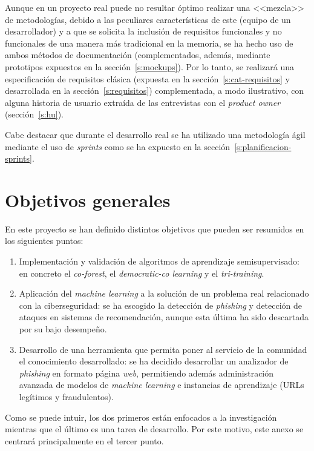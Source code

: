Aunque en un proyecto real puede no resultar óptimo realizar una <<mezcla>> de metodologías, debido a las peculiares características de este (equipo de un desarrollador) y a que se solicita la inclusión de requisitos funcionales y no funcionales de una manera más tradicional en la memoria, se ha hecho uso de ambos métodos de documentación (complementados, además, mediante prototipos expuestos en la sección~\ref{s:mockups}). Por lo tanto, se realizará una especificación de requisitos clásica (expuesta en la sección~\ref{s:cat-requisitos} y desarrollada en la sección~\ref{s:requisitos}) complementada, a modo ilustrativo, con alguna historia de usuario extraída de las entrevistas con el \textit{product owner} (sección~\ref{s:hu}). 

Cabe destacar que durante el desarrollo real se ha utilizado una metodología ágil mediante el uso de \textit{sprints} como se ha expuesto en la sección~\ref{s:planificacion-sprints}.

\section{Objetivos generales}

En este proyecto se han definido distintos objetivos que pueden ser resumidos en los siguientes puntos:
\begin{enumerate}
	\item Implementación y validación de algoritmos de aprendizaje semisupervisado: en concreto el \textit{co-forest}, el \textit{democratic-co learning} y el \textit{tri-training}.
	\item Aplicación del \textit{machine learning} a la solución de un problema real relacionado con la ciberseguridad: se ha escogido la detección de \textit{phishing} y detección de ataques en sistemas de recomendación, aunque esta última ha sido descartada por su bajo desempeño.
	\item Desarrollo de una herramienta que permita poner al servicio de la comunidad el conocimiento desarrollado: se ha decidido desarrollar un analizador de \textit{phishing} en formato página \textit{web}, permitiendo además administración avanzada de modelos de \textit{machine learning} e instancias de aprendizaje (URLs legítimos y fraudulentos).
\end{enumerate}

Como se puede intuir, los dos primeros están enfocados a la investigación mientras que el último es una tarea de desarrollo. Por este motivo, este anexo se centrará principalmente en el tercer punto.


